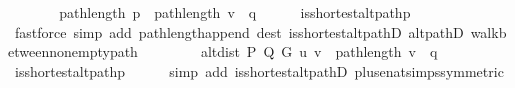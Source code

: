 \begin{isabellebody}
\ \ \isamarkupfalse%
\ \isamarkupfalse%
\ {\isachardoublequoteopen}{\isachardot}{\kern0pt}{\isachardot}{\kern0pt}{\isachardot}{\kern0pt}\ {\isacharequal}{\kern0pt}\ path{\isacharunderscore}{\kern0pt}length\ p{\isacharprime}{\kern0pt}\ {\isacharplus}{\kern0pt}\ path{\isacharunderscore}{\kern0pt}length\ {\isacharparenleft}{\kern0pt}v\ {\isacharhash}{\kern0pt}\ q{\isacharparenright}{\kern0pt}{\isachardoublequoteclose}\isanewline
\ \ \ \ \isamarkupfalse%
\ is{\isacharunderscore}{\kern0pt}shortest{\isacharunderscore}{\kern0pt}alt{\isacharunderscore}{\kern0pt}path{\isacharunderscore}{\kern0pt}p{\isacharprime}{\kern0pt}\isanewline
\ \ \ \ \isamarkupfalse%
\ {\isacharparenleft}{\kern0pt}fastforce\ simp\ add{\isacharcolon}{\kern0pt}\ path{\isacharunderscore}{\kern0pt}length{\isacharunderscore}{\kern0pt}append\ dest{\isacharcolon}{\kern0pt}\ is{\isacharunderscore}{\kern0pt}shortest{\isacharunderscore}{\kern0pt}alt{\isacharunderscore}{\kern0pt}pathD{\isacharparenleft}{\kern0pt}{}{\isacharparenright}{\kern0pt}\ alt{\isacharunderscore}{\kern0pt}pathD{\isacharparenleft}{\kern0pt}{}{\isacharparenright}{\kern0pt}\ walk{\isacharunderscore}{\kern0pt}between{\isacharunderscore}{\kern0pt}nonempty{\isacharunderscore}{\kern0pt}path{\isacharparenleft}{\kern0pt}{}{\isacharcomma}{\kern0pt}\ {}{\isacharparenright}{\kern0pt}{\isacharparenright}{\kern0pt}\isanewline
\ \ \isamarkupfalse%
\ \isamarkupfalse%
\ {\isachardoublequoteopen}{\isachardot}{\kern0pt}{\isachardot}{\kern0pt}{\isachardot}{\kern0pt}\ {\isacharequal}{\kern0pt}\ alt{\isacharunderscore}{\kern0pt}dist\ P\ Q\ G\ u\ v\ {\isacharplus}{\kern0pt}\ path{\isacharunderscore}{\kern0pt}length\ {\isacharparenleft}{\kern0pt}v\ {\isacharhash}{\kern0pt}\ q{\isacharparenright}{\kern0pt}{\isachardoublequoteclose}\isanewline
\ \ \ \ \isamarkupfalse%
\ is{\isacharunderscore}{\kern0pt}shortest{\isacharunderscore}{\kern0pt}alt{\isacharunderscore}{\kern0pt}path{\isacharunderscore}{\kern0pt}p{\isacharprime}{\kern0pt}\isanewline
\ \ \ \ \isamarkupfalse%
\ {\isacharparenleft}{\kern0pt}simp\ add{\isacharcolon}{\kern0pt}\ is{\isacharunderscore}{\kern0pt}shortest{\isacharunderscore}{\kern0pt}alt{\isacharunderscore}{\kern0pt}pathD{\isacharparenleft}{\kern0pt}{}{\isacharparenright}{\kern0pt}\ plus{\isacharunderscore}{\kern0pt}enat{\isacharunderscore}{\kern0pt}simps{\isacharparenleft}{\kern0pt}{}{\isacharparenright}{\kern0pt}{\isacharbrackleft}{\kern0pt}symmetric{\isacharbrackright}{\kern0pt}{\isacharparenright}{\kern0pt}\isanewline

\end{isabellebody}

